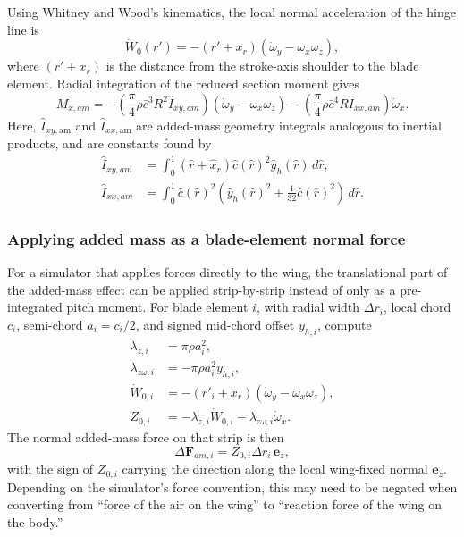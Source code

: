 \documentclass{article}
\begin{document}
Using Whitney and Wood's kinematics, the local normal acceleration of the hinge line is
\begin{equation}
\dot{W}_0(r') = - (r' + x_r)\left(\dot{\omega}_y - \omega_x\omega_z\right),
\end{equation}
where \((r' + x_r)\) is the distance from the stroke-axis shoulder to the blade element. Radial integration of the reduced section moment gives
\begin{equation}
M_{x,am}
=
-
\left(
\frac{\pi}{4}\rho \bar{c}^{3} R^{2}\hat{I}_{xy,am}
\right)
\left(
\dot{\omega}_y - \omega_x\omega_z
\right)
-
\left(
\frac{\pi}{4}\rho \bar{c}^{4} R \hat{I}_{xx,am}
\right)
\dot{\omega}_x .
\end{equation}
Here, \(\hat{I}_{xy,\mathrm{am}}\) and \(\hat{I}_{xx,\mathrm{am}}\) are added-mass geometry integrals analogous to inertial products, and are constants found by
\begin{align}
\hat{I}_{xy,am}
&= \int_{0}^{1}
(\hat{r} + \hat{x}_r)\hat{c}(\hat{r})^2 \hat{y}_h(\hat{r}) \, d\hat{r}, \\[4pt]
\hat{I}_{xx,am}
&= \int_{0}^{1}
\hat{c}(\hat{r})^2
\left(
\hat{y}_h(\hat{r})^2 + \frac{1}{32}\hat{c}(\hat{r})^2
\right)
\, d\hat{r}.
\end{align}

\subsubsection{Applying added mass as a blade-element normal force}
\label{sec:added_mass_normal_force}
For a simulator that applies forces directly to the wing, the translational part of the added-mass effect can be applied strip-by-strip instead of only as a pre-integrated pitch moment. For blade element \(i\), with radial width \(\Delta r_i\), local chord \(c_i\), semi-chord \(a_i=c_i/2\), and signed mid-chord offset \(y_{h,i}\), compute
\begin{align}
\lambda_{z,i} &= \pi\rho a_i^2, \\
\lambda_{z\omega,i} &= -\pi\rho a_i^2 y_{h,i}, \\
\dot{W}_{0,i} &= -(r'_i+x_r)\left(\dot{\omega}_y-\omega_x\omega_z\right), \\
Z_{0,i} &= -\lambda_{z,i}\dot{W}_{0,i} - \lambda_{z\omega,i}\dot{\omega}_x .
\end{align}
The normal added-mass force on that strip is then
\begin{equation}
\Delta \mathbf{F}_{am,i} = Z_{0,i}\Delta r_i\,\mathbf{e}_z,
\label{eq:blade_added_mass_force}
\end{equation}
with the sign of \(Z_{0,i}\) carrying the direction along the local wing-fixed normal \(\mathbf{e}_z\). Depending on the simulator's force convention, this may need to be negated when converting from ``force of the air on the wing'' to ``reaction force of the wing on the body.''
\end{document}
